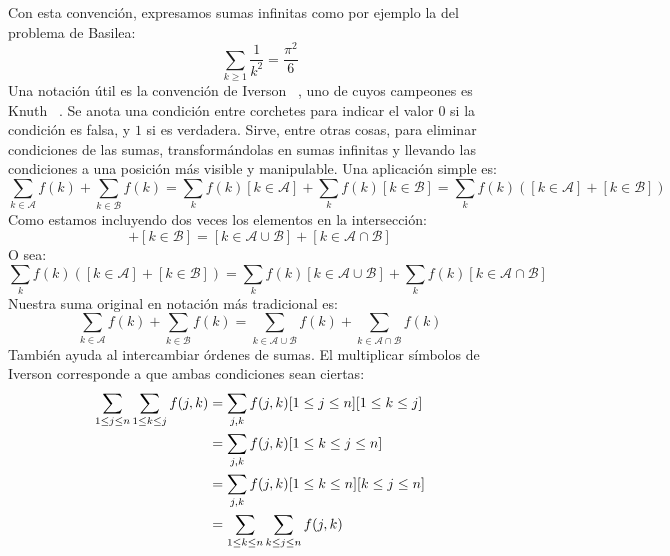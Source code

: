   Con esta convención,
  expresamos sumas infinitas como por ejemplo
  la del problema de Basilea:%
  \begin{equation*}
    \sum_{k \ge 1} \frac{1}{k^2}
      = \frac{\pi^2}{6}
  \end{equation*}
  Una notación útil es la convención de Iverson~%
    \cite{iverson62:_APL},
  uno de cuyos campeones es Knuth~%
    \cite{graham94:_concr_mathem, knuth92:_two_notes_notat}.
  Se anota una condición entre corchetes
  para indicar el valor \(0\) si la condición es falsa,
  y \(1\) si es verdadera.
  Sirve,
  entre otras cosas,
  para eliminar condiciones de las sumas,
  transformándolas en sumas infinitas
  y llevando las condiciones
  a una posición más visible y manipulable.
  Una aplicación simple es:
  \begin{equation*}
    \sum_{k \in \mathcal{A}} f(k) + \sum_{k \in \mathcal{B}} f(k)
      = \sum_k f(k) [ k \in \mathcal{A} ]
	  + \sum_k f(k) [ k \in \mathcal{B} ]
      = \sum_k f(k) ([ k \in \mathcal{A} ] + [ k \in \mathcal{B} ])
  \end{equation*}
  Como estamos incluyendo dos veces
  los elementos en la intersección:
  \begin{equation*}
    [ k \in \mathcal{A} ] + [ k \in \mathcal{B} ]
      = [ k \in \mathcal{A} \cup \mathcal{B} ]
	  + [ k \in \mathcal{A} \cap \mathcal{B} ]
  \end{equation*}
  O sea:
  \begin{equation*}
    \sum_k f(k) ([ k \in \mathcal{A} ] + [ k \in \mathcal{B} ])
      = \sum_k f(k) [ k \in \mathcal{A} \cup \mathcal{B} ]
	  + \sum_k f(k)[ k \in \mathcal{A} \cap \mathcal{B} ]
  \end{equation*}
  Nuestra suma original en notación más tradicional es:
  \begin{equation}
    \label{eq:suma-union-interseccion}
    \sum_{k \in \mathcal{A}} f(k) + \sum_{k \in \mathcal{B}} f(k)
      = \sum_{k \in \mathcal{A} \cup \mathcal{B}} f(k)
	  + \sum_{k \in \mathcal{A} \cap \mathcal{B}} f(k)
  \end{equation}
  También ayuda al intercambiar órdenes de sumas.
  El multiplicar símbolos de Iverson%
  corresponde a que ambas condiciones sean ciertas:
  \begin{align}
    \sum_{1 \le j \le n} \sum_{1 \le k \le j} f(j, k)
      &= \sum_{j, k} f(j, k) [1 \le j \le n] [1 \le k \le j]
	    \notag \\
      &= \sum_{j, k} f(j, k) [1 \le k \le j \le n]
	    \notag \\
      &= \sum_{j, k} f(j, k) [1 \le k \le n] [ k \le j \le n]
	    \notag \\
      &= \sum_{1 \le k \le n} \sum_{k \le j \le n} f(j, k)
	    \label{eq:suma-intercambio}
  \end{align}
